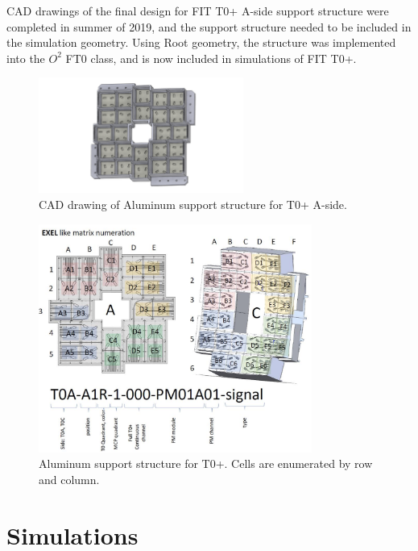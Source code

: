 CAD drawings of the final design for FIT T0+ A-side support structure were completed in summer of 2019, and the support structure needed to be included in the simulation geometry. Using Root geometry, the structure was implemented into the $O^2$ FT0 class, and is now included in simulations of FIT T0+. 

\begin{figure}[H]
    \centering
    \includegraphics[width=0.6\textwidth]{figures/FIT/FIT_Support_Structure_CAD.pdf}
    \caption{CAD drawing of Aluminum support structure for T0+ A-side.}
    \label{fig:FT0_CAD}
\end{figure}

\begin{figure}[H]
    \centering
    \includegraphics[width=0.8\textwidth]{figures/FIT/T0_Structure_and_Cell_Numbers.png}
    \caption{Aluminum support structure for T0+. Cells are enumerated by row and column.}
    \label{fig:FT0_Labels}
\end{figure}

\section{Simulations}
